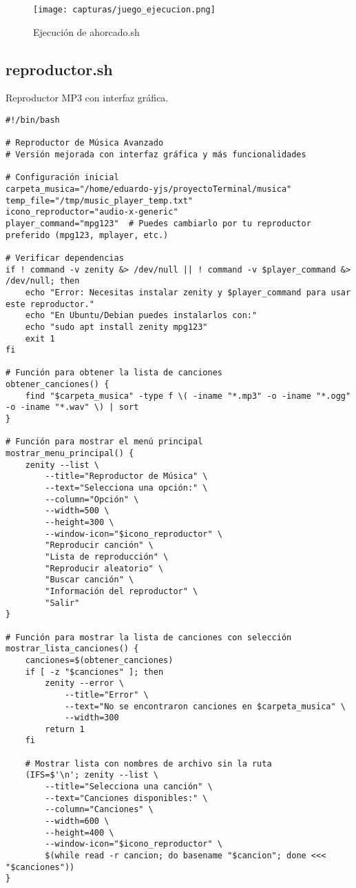 \documentclass[12pt]{article}
\begin{document}
\begin{figure}[H]
    \centering
    \texttt{[image: capturas/juego\_ejecucion.png]}
    \caption{Ejecución de ahorcado.sh}
\end{figure}

\newpage
\subsection{reproductor.sh}
Reproductor MP3 con interfaz gráfica.

\begin{lstlisting}[caption={mp3Player.sh}]
#!/bin/bash

# Reproductor de Música Avanzado
# Versión mejorada con interfaz gráfica y más funcionalidades

# Configuración inicial
carpeta_musica="/home/eduardo-yjs/proyectoTerminal/musica"
temp_file="/tmp/music_player_temp.txt"
icono_reproductor="audio-x-generic"
player_command="mpg123"  # Puedes cambiarlo por tu reproductor preferido (mpg123, mplayer, etc.)

# Verificar dependencias
if ! command -v zenity &> /dev/null || ! command -v $player_command &> /dev/null; then
    echo "Error: Necesitas instalar zenity y $player_command para usar este reproductor."
    echo "En Ubuntu/Debian puedes instalarlos con:"
    echo "sudo apt install zenity mpg123"
    exit 1
fi

# Función para obtener la lista de canciones
obtener_canciones() {
    find "$carpeta_musica" -type f \( -iname "*.mp3" -o -iname "*.ogg" -o -iname "*.wav" \) | sort
}

# Función para mostrar el menú principal
mostrar_menu_principal() {
    zenity --list \
        --title="Reproductor de Música" \
        --text="Selecciona una opción:" \
        --column="Opción" \
        --width=500 \
        --height=300 \
        --window-icon="$icono_reproductor" \
        "Reproducir canción" \
        "Lista de reproducción" \
        "Reproducir aleatorio" \
        "Buscar canción" \
        "Información del reproductor" \
        "Salir"
}

# Función para mostrar la lista de canciones con selección
mostrar_lista_canciones() {
    canciones=$(obtener_canciones)
    if [ -z "$canciones" ]; then
        zenity --error \
            --title="Error" \
            --text="No se encontraron canciones en $carpeta_musica" \
            --width=300
        return 1
    fi
    
    # Mostrar lista con nombres de archivo sin la ruta
    (IFS=$'\n'; zenity --list \
        --title="Selecciona una canción" \
        --text="Canciones disponibles:" \
        --column="Canciones" \
        --width=600 \
        --height=400 \
        --window-icon="$icono_reproductor" \
        $(while read -r cancion; do basename "$cancion"; done <<< "$canciones"))
}


\end{lstlisting}
\end{document}
